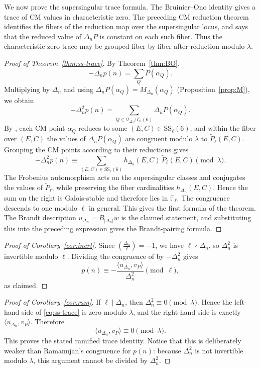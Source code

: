 \documentclass[12pt]{amsart}
\theoremstyle{definition}
\theoremstyle{remark}
\newcommand{\ssloc}{\mathrm{SS}}
\begin{document}
We now prove the supersingular trace formula.  The Bruinier--Ono
identity gives a trace of CM values in characteristic zero.  The
preceding CM reduction theorem identifies the fibers of the reduction
map over the supersingular locus, and  says
that the reduced value of $\Delta_n P$ is constant on each such fiber.
Thus the characteristic-zero trace may be grouped fiber by fiber after
reduction modulo $\lambda$.

\begin{proof}[Proof of Theorem~\ref{thm:ss-trace}]
By Theorem~\ref{thm:BO},
\[
-\Delta_n p(n)=\sum_Q P(\alpha_Q).
\]
Multiplying by $\Delta_n$ and using
$\Delta_n P(\alpha_Q)=M_{\Delta_n}(\alpha_Q)$
(Proposition~\ref{prop:M}), we obtain
\[
-\Delta_n^2 p(n)=
\sum_{Q\in \mathcal Q_{\Delta_n}/\Gamma_0(6)}
\Delta_n P(\alpha_Q).
\]
By , each CM point $\alpha_Q$ reduces to
some $(E,C)\in \ssloc_\ell(6)$, and within the fiber over $(E,C)$ the
values of $\Delta_nP(\alpha_Q)$ are congruent modulo $\lambda$ to
$\widetilde P_\ell(E,C)$.  Grouping the CM points according to their
reductions gives
\[
-\Delta_n^2p(n)\equiv
\sum_{(E,C)\in\ssloc_\ell(6)}
h_{\Delta_n}(E,C)\,\widetilde P_\ell(E,C)
\pmod{\lambda}.
\]
The Frobenius automorphism acts on the supersingular classes and
conjugates the values of $\widetilde P_\ell$, while preserving the
fiber cardinalities $h_{\Delta_n}(E,C)$.  Hence the sum on the
right is Galois-stable and therefore lies in $\mathbb F_\ell$.  The
congruence descends to one modulo $\ell$ in general.  This gives the
first formula of the theorem.  The Brandt description
$u_{\Delta_n}=B_{|\Delta_n|}w$ is the claimed statement, and substituting this into the preceding expression
gives the Brandt-pairing formula.
\end{proof}

\begin{proof}[Proof of Corollary~\ref{cor:inert}]
Since $\left(\frac{\Delta_n}{\ell}\right)=-1$, we have $\ell\nmid\Delta_n$, so
$\Delta_n^2$ is invertible modulo $\ell$.  Dividing the congruence of
 by $-\Delta_n^2$ gives
\[
        p(n)\equiv-\frac{\langle u_{\Delta_n},v_P\rangle}{\Delta_n^2}\pmod\ell,
\]
as claimed.
\end{proof}

\begin{proof}[Proof of Corollary~\ref{cor:ram}]
If $\ell\mid\Delta_n$, then $\Delta_n^2\equiv0\pmod\lambda$.  Hence the
left-hand side of \eqref{eq:ss-trace} is zero modulo $\lambda$, and the
right-hand side is exactly $\langle u_{\Delta_n},v_P\rangle$.  Therefore
\[
        \langle u_{\Delta_n},v_P\rangle\equiv0\pmod\lambda.
\]
This proves the stated ramified trace identity.  Notice that this is deliberately weaker
than Ramanujan's congruence for $p(n)$: because $\Delta_n^2$ is not invertible modulo
$\lambda$, this argument cannot be divided by $\Delta_n^2$.
\end{proof}
\end{document}
